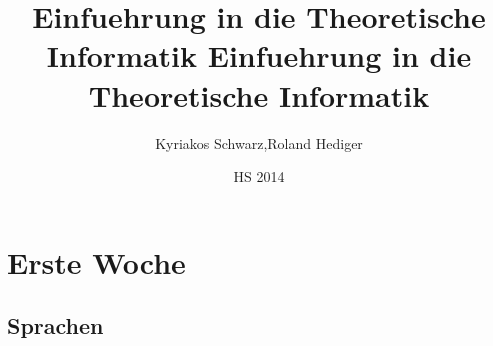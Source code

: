 \documentclass[18pt,a4paper]{scrreprt}
\title{Einfuehrung in die Theoretische Informatik}
\title{
	\vspace{5cm}
	Einfuehrung in die Theoretische Informatik \\
}
\author{Kyriakos Schwarz,Roland Hediger}
\date{HS 2014}
\begin{document}
\maketitle
\thispagestyle{fancy}
\newpage

\tableofcontents	  	
\newpage



\chapter{Erste Woche}


\section{Sprachen}
\end{document}
